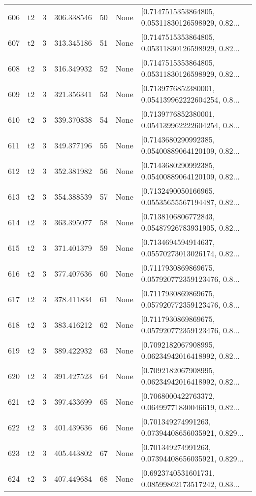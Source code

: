\begin{tabular}{lllrlll}
606 &  t2 &   3 &   306.338546 &   50 &  None &  [0.7147515353864805, 0.05311830126598929, 0.82... \\
607 &  t2 &   3 &   313.345186 &   51 &  None &  [0.7147515353864805, 0.05311830126598929, 0.82... \\
608 &  t2 &   3 &   316.349932 &   52 &  None &  [0.7147515353864805, 0.05311830126598929, 0.82... \\
609 &  t2 &   3 &   321.356341 &   53 &  None &  [0.7139776852380001, 0.054139962222604254, 0.8... \\
610 &  t2 &   3 &   339.370838 &   54 &  None &  [0.7139776852380001, 0.054139962222604254, 0.8... \\
611 &  t2 &   3 &   349.377196 &   55 &  None &  [0.7143680290992385, 0.05400889064120109, 0.82... \\
612 &  t2 &   3 &   352.381982 &   56 &  None &  [0.7143680290992385, 0.05400889064120109, 0.82... \\
613 &  t2 &   3 &   354.388539 &   57 &  None &  [0.7132490050166965, 0.05535655567194487, 0.82... \\
614 &  t2 &   3 &   363.395077 &   58 &  None &  [0.7138106806772843, 0.05487926783931905, 0.82... \\
615 &  t2 &   3 &   371.401379 &   59 &  None &  [0.7134694594914637, 0.05570273013026174, 0.82... \\
616 &  t2 &   3 &   377.407636 &   60 &  None &  [0.7117930869869675, 0.057920772359123476, 0.8... \\
617 &  t2 &   3 &   378.411834 &   61 &  None &  [0.7117930869869675, 0.057920772359123476, 0.8... \\
618 &  t2 &   3 &   383.416212 &   62 &  None &  [0.7117930869869675, 0.057920772359123476, 0.8... \\
619 &  t2 &   3 &   389.422932 &   63 &  None &  [0.7092182067908995, 0.06234942016418992, 0.82... \\
620 &  t2 &   3 &   391.427523 &   64 &  None &  [0.7092182067908995, 0.06234942016418992, 0.82... \\
621 &  t2 &   3 &   397.433699 &   65 &  None &  [0.7068000422763372, 0.06499771830046619, 0.82... \\
622 &  t2 &   3 &   401.439636 &   66 &  None &  [0.701349274991263, 0.07394408656035921, 0.829... \\
623 &  t2 &   3 &   405.443802 &   67 &  None &  [0.701349274991263, 0.07394408656035921, 0.829... \\
624 &  t2 &   3 &   407.449684 &   68 &  None &  [0.6923740531601731, 0.08599862173517242, 0.83... \\

\end{tabular}
